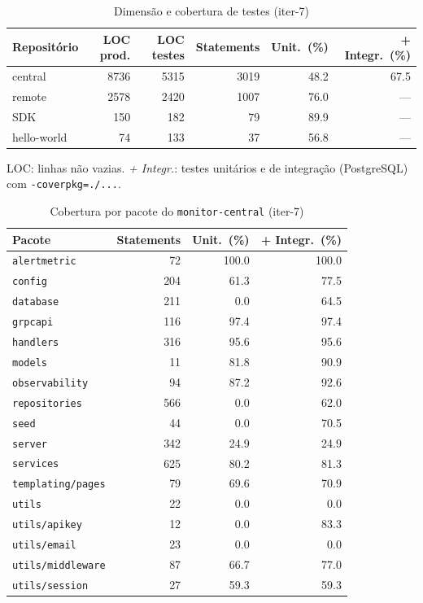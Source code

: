 \begin{table}[htbp]
  \centering\small
  \caption{Dimensão e cobertura de testes (iter-7)}
  \label{tab:iter-7-cobertura}
  \begin{tabular}{lrrrrr}
    \toprule
    Repositório & LOC prod. & LOC testes & Statements & Unit.\ (\%) & + Integr.\ (\%) \\
    \midrule
    central & 8736 & 5315 & 3019 & 48.2 & 67.5 \\
    remote & 2578 & 2420 & 1007 & 76.0 & --- \\
    SDK & 150 & 182 & 79 & 89.9 & --- \\
    hello-world & 74 & 133 & 37 & 56.8 & --- \\
    \bottomrule
  \end{tabular}
  \par\smallskip\footnotesize LOC: linhas não vazias. \emph{+ Integr.}: testes unitários e de integração (PostgreSQL) com \texttt{-coverpkg=./...}.
\end{table}

\begin{table}[htbp]
  \centering\small
  \caption{Cobertura por pacote do \texttt{monitor-central} (iter-7)}
  \label{tab:iter-7-cobertura-central}
  \begin{tabular}{lrrr}
    \toprule
    Pacote & Statements & Unit.\ (\%) & + Integr.\ (\%) \\
    \midrule
    \texttt{alertmetric} & 72 & 100.0 & 100.0 \\
    \texttt{config} & 204 & 61.3 & 77.5 \\
    \texttt{database} & 211 & 0.0 & 64.5 \\
    \texttt{grpcapi} & 116 & 97.4 & 97.4 \\
    \texttt{handlers} & 316 & 95.6 & 95.6 \\
    \texttt{models} & 11 & 81.8 & 90.9 \\
    \texttt{observability} & 94 & 87.2 & 92.6 \\
    \texttt{repositories} & 566 & 0.0 & 62.0 \\
    \texttt{seed} & 44 & 0.0 & 70.5 \\
    \texttt{server} & 342 & 24.9 & 24.9 \\
    \texttt{services} & 625 & 80.2 & 81.3 \\
    \texttt{templating/pages} & 79 & 69.6 & 70.9 \\
    \texttt{utils} & 22 & 0.0 & 0.0 \\
    \texttt{utils/apikey} & 12 & 0.0 & 83.3 \\
    \texttt{utils/email} & 23 & 0.0 & 0.0 \\
    \texttt{utils/middleware} & 87 & 66.7 & 77.0 \\
    \texttt{utils/session} & 27 & 59.3 & 59.3 \\
    \bottomrule
  \end{tabular}
\end{table}
